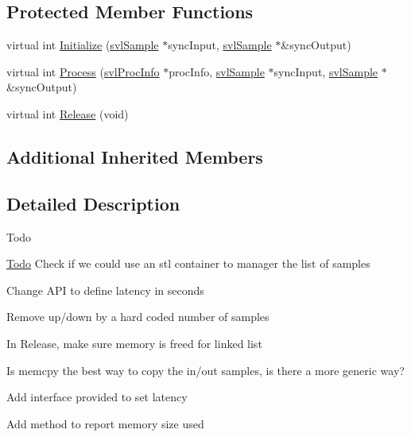 \subsection*{Protected Member Functions}
\begin{DoxyCompactItemize}
\item 
virtual int \hyperlink{classsvl_filter_add_latency_ad06a3990b76dfac940511599a2878d2c}{Initialize} (\hyperlink{classsvl_sample}{svl\-Sample} $\ast$sync\-Input, \hyperlink{classsvl_sample}{svl\-Sample} $\ast$\&sync\-Output)
\item 
virtual int \hyperlink{classsvl_filter_add_latency_ada70c21a47779f0a2c1342bd487ee17a}{Process} (\hyperlink{structsvl_proc_info}{svl\-Proc\-Info} $\ast$proc\-Info, \hyperlink{classsvl_sample}{svl\-Sample} $\ast$sync\-Input, \hyperlink{classsvl_sample}{svl\-Sample} $\ast$\&sync\-Output)
\item 
virtual int \hyperlink{classsvl_filter_add_latency_af980f5dc40c61ea9c2430fecbe123ef8}{Release} (void)
\end{DoxyCompactItemize}
\subsection*{Additional Inherited Members}


\subsection{Detailed Description}
\begin{DoxyRefDesc}{Todo}
\item[\hyperlink{todo__todo000013}{Todo}]Check if we could use an stl container to manager the list of samples 

Change A\-P\-I to define latency in seconds 

Remove up/down by a hard coded number of samples 

In Release, make sure memory is freed for linked list 

Is memcpy the best way to copy the in/out samples, is there a more generic way? 

Add interface provided to set latency 

Add method to report memory size used \end{DoxyRefDesc}



